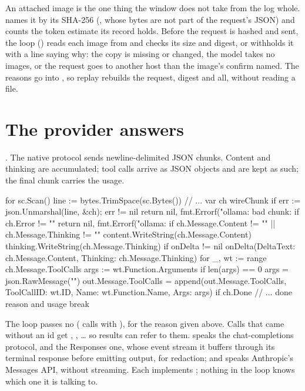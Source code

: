 An attached image is the one thing the window does not take from the log
whole.  names it by its SHA-256 (, whose bytes
are not part of the request's JSON) and counts the token estimate its
 record holds. Before the request is hashed and sent, the loop
() reads each image from
 and checks its size and digest, or withholds it
with a line saying why: the copy is missing or changed, the model takes no
images, or the request goes to another host than the image's confirm named.
The reasons go into , so replay rebuilds the request, digest
and all, without reading a file.

\section{The provider answers}

. The native  protocol sends
newline-delimited JSON chunks. Content and thinking are accumulated; tool
calls arrive as JSON objects and are kept as such; the final chunk carries
the usage.

\begin{go}
for sc.Scan() {
    line := bytes.TrimSpace(sc.Bytes())
    // ...
    var ch wireChunk
    if err := json.Unmarshal(line, &ch); err != nil {
        return nil, fmt.Errorf("ollama: bad chunk: %
    }
    if ch.Error != "" {
        return nil, fmt.Errorf("ollama: %
    }
    if ch.Message.Content != "" || ch.Message.Thinking != "" {
        content.WriteString(ch.Message.Content)
        thinking.WriteString(ch.Message.Thinking)
        if onDelta != nil {
            onDelta(Delta{Text: ch.Message.Content, Thinking: ch.Message.Thinking})
        }
    }
    for _, wt := range ch.Message.ToolCalls {
        args := wt.Function.Arguments
        if len(args) == 0 {
            args = json.RawMessage("{}")
        }
        out.Message.ToolCalls = append(out.Message.ToolCalls, ToolCall{ID: wt.ID, Name: wt.Function.Name, Args: args})
    }
    if ch.Done {
        // ... done reason and usage
        break
    }
}
\end{go}

The loop passes no  ( calls
 with ), for the reason given above. Calls that came
without an id get , , \ldots{} so results can
refer to them.  speaks the chat-completions
protocol, and the Responses one, whose event stream it buffers through its
terminal response before emitting output, for redaction; and
 speaks Anthropic's Messages API, without
streaming. Each implements ; nothing in the loop knows
which one it is talking to.

